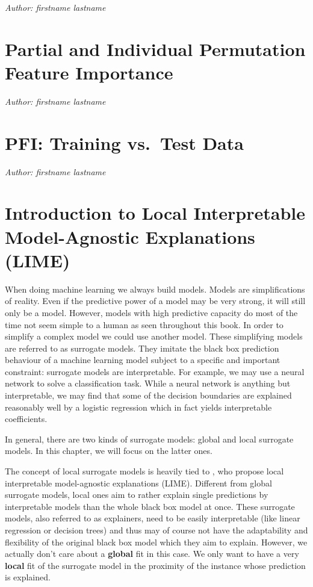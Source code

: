\documentclass[
]{krantz}
\begin{document}
\emph{Author: firstname lastname}

\hypertarget{partial-and-individual-permutation-feature-importance}{%
\chapter{Partial and Individual Permutation Feature Importance}\label{partial-and-individual-permutation-feature-importance}}

\emph{Author: firstname lastname}

\hypertarget{pfi-training-vs.-test-data}{%
\chapter{PFI: Training vs.~Test Data}\label{pfi-training-vs.-test-data}}

\emph{Author: firstname lastname}

\hypertarget{introduction-to-local-interpretable-model-agnostic-explanations-lime}{%
\chapter{Introduction to Local Interpretable Model-Agnostic Explanations (LIME)}\label{introduction-to-local-interpretable-model-agnostic-explanations-lime}}

When doing machine learning we always build models.
Models are simplifications of reality.
Even if the predictive power of a model may be very strong, it will still only be a model.
However, models with high predictive capacity do most of the time not seem simple to a human as seen throughout this book.
In order to simplify a complex model we could use another model.
These simplifying models are referred to as surrogate models.
They imitate the black box prediction behaviour of a machine learning model subject to a specific and important constraint:
surrogate models are interpretable.
For example, we may use a neural network to solve a classification task.
While a neural network is anything but interpretable, we may find that some of the decision boundaries are explained reasonably well by a logistic regression which in fact yields interpretable coefficients.

In general, there are two kinds of surrogate models: global and local surrogate models.
In this chapter, we will focus on the latter ones.

The concept of local surrogate models is heavily tied to \citet{ribeiro2016should}, who propose local interpretable model-agnostic explanations (LIME).
Different from global surrogate models, local ones aim to rather explain single predictions by interpretable models than the whole black box model at once.
These surrogate models, also referred to as explainers, need to be easily interpretable (like linear regression or decision trees) and thus may of course not have the adaptability and flexibility of the original black box model which they aim to explain.
However, we actually don't care about a \textbf{global} fit in this case.
We only want to have a very \textbf{local} fit of the surrogate model in the proximity of the instance whose prediction is explained.
\end{document}
